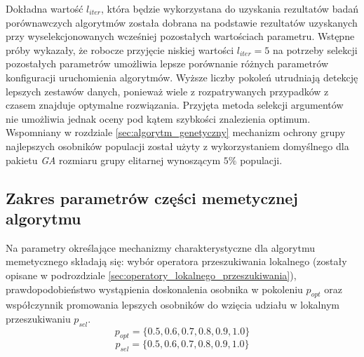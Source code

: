 \par
Dokładna wartość $l_{iter}$, która będzie wykorzystana do uzyskania rezultatów badań porównawczych algorytmów została dobrana na podstawie rezultatów uzyskanych przy wyselekcjonowanych wcześniej pozostałych wartościach parametru. Wstępne próby wykazały, że robocze przyjęcie niskiej wartości $l_{iter}=5$ na potrzeby selekcji pozostałych parametrów umożliwia lepsze porównanie różnych parametrów konfiguracji uruchomienia algorytmów. Wyższe liczby pokoleń utrudniają detekcję lepszych zestawów danych, ponieważ wiele z rozpatrywanych przypadków z czasem znajduje optymalne rozwiązania. Przyjęta metoda selekcji argumentów nie umożliwia jednak oceny pod kątem szybkości znalezienia optimum. Wspomniany w rozdziale \ref{sec:algorytm_genetyczny} mechanizm ochrony grupy najlepszych osobników populacji został użyty z wykorzystaniem domyślnego dla pakietu \emph{GA} rozmiaru grupy elitarnej wynoszącym $5\%$ populacji.





\subsection{Zakres parametrów części memetycznej algorytmu}
Na parametry określające mechanizmy charakterystyczne dla algorytmu memetycznego składają się: wybór operatora przeszukiwania lokalnego (zostały opisane w podrozdziale \ref{sec:operatory_lokalnego_przeszukiwania}), prawdopodobieństwo wystąpienia doskonalenia osobnika w pokoleniu $p_{opt}$ oraz współczynnik promowania lepszych osobników do wzięcia udziału w lokalnym przeszukiwaniu $p_{sel}$. 
\[p_{opt} = \lbrace0.5, 0.6, 0.7, 0.8, 0.9, 1.0\rbrace\]
\[p_{sel} = \lbrace0.5, 0.6, 0.7, 0.8, 0.9, 1.0\rbrace\]


